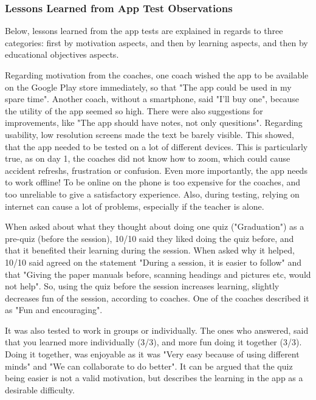     \subsubsection{Lessons Learned from App Test Observations}

    Below, lessons learned from the app tests are explained in regards to three categories: first by motivation aspects, and then by learning aspects, and then by educational objectives aspects.

    Regarding motivation from the coaches, one coach wished the app to be available on the Google Play store immediately, so that "The app could be used in my spare time". Another coach, without a smartphone, said "I'll buy one", because the utility of the app seemed so high. There were also suggestions for improvements, like "The app should have notes, not only quesitions". Regarding usability, low resolution screens made the text be barely visible. This showed, that the app needed to be tested on a lot of different devices. This is particularly true, as on day 1, the coaches did not know how to zoom, which could cause accident refreshs, frustration or confusion. Even more importantly, the app needs to work offline! To be online on the phone is too expensive for the coaches, and too unreliable to give a satisfactory experience. Also, during testing, relying on internet can cause a lot of problems, especially if the teacher is alone.

    When asked about what they thought about doing one quiz ("Graduation") as a pre-quiz (before the session), 10/10 said they liked doing the quiz before, and that it benefited their learning during the session. When asked why it helped, 10/10 said agreed on the statement "During a session, it is easier to follow" and that "Giving the paper manuals before, scanning headings and pictures etc, would not help". So, using the quiz before the session increases learning, slightly decreases fun of the session, according to coaches. One of the coaches described it as "Fun and encouraging".

    It was also tested to work in groups or individually. The ones who answered, said that you learned more individually (3/3), and more fun doing it together (3/3). Doing it together, was enjoyable as it was "Very easy because of using different minds" and "We can collaborate to do better". It can be argued that the quiz being easier is not a valid motivation, but describes the learning in the app as a desirable difficulty.

